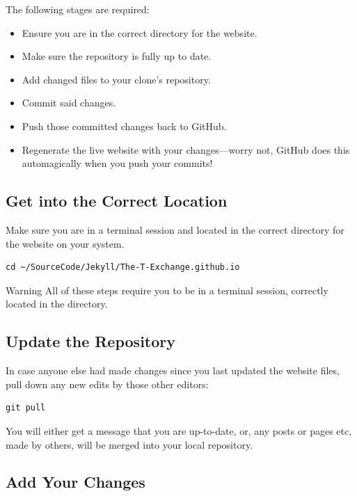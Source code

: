 The following stages are required:

\begin{itemize}
    \item Ensure you are in the correct directory for the website.
    \item Make sure the repository is fully up to date.
    \item Add changed files to your clone's repository.
    \item Commit said changes.
    \item Push those committed changes back to GitHub.
    \item Regenerate the live website with your changes---worry not, GitHub does this automagically when you push your commits!
\end{itemize}

\subsection{Get into the Correct Location}

Make sure you are in a terminal session and located in the correct directory for the website on your system.

\begin{lstlisting}[style=myText]
    cd ~/SourceCode/Jekyll/The-T-Exchange.github.io
\end{lstlisting}


\begin{tips}{Warning}
    All of these steps require you to be in a terminal session, correctly located in the  directory.
\end{tips}

\subsection{Update the Repository}

In case anyone else had made changes since you last updated the website files, pull down any new edits by those other editors:

\begin{lstlisting}[style=myText]
git pull
\end{lstlisting}

You will either get a message that you are up-to-date, or, any posts or pages etc, made by others, will be merged into your local repository.

\subsection{Add Your Changes}

